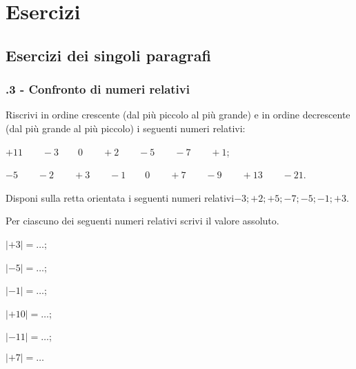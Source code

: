 \section{Esercizi}
\subsection{Esercizi dei singoli paragrafi}
\subsubsection*{\thechapter.3 - Confronto di numeri relativi}


\begin{esercizio}
 \label{ese:2.1}
Riscrivi in ordine crescente (dal più piccolo al più grande) e in ordine decrescente (dal più grande al più piccolo) i seguenti numeri relativi:
\begin{enumeratea}
\item $ +11\qquad-3\qquad0\qquad+2\qquad-5\qquad-7\qquad+1 $;
\item $ -5\qquad-2\qquad+3\qquad-1\qquad0\qquad+7\qquad-9\qquad+13\qquad-21 $.
\end{enumeratea}
\end{esercizio}

\begin{esercizio}
 \label{ese:2.2}
Disponi sulla retta orientata i seguenti numeri relativi$-3; +2; +5; -7; -5; -1; +3$.
\begin{center}
 
\end{center}

\end{esercizio}

\begin{esercizio}
 \label{ese:2.3}
Per ciascuno dei seguenti numeri relativi scrivi il valore assoluto.
\begin{multicols}{3}
\begin{enumeratea}
 \item $|+3|=\ldots$;
 \item $|-5|=\ldots$;
 \item $|-1|=\ldots$;
 \item $|+10|=\ldots$;
 \item $|-11|=\ldots$;
 \item $|+7|=\ldots$
\end{enumeratea}
\end{multicols}
\end{esercizio}

